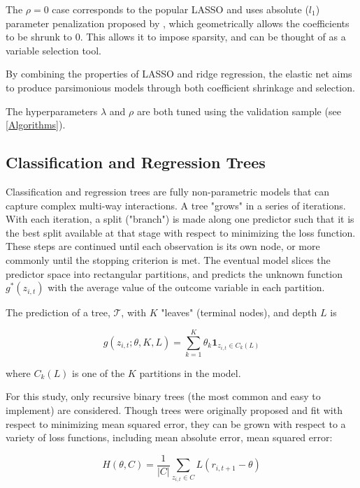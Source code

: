 \documentclass[a4paper, table]{article}
\begin{document}
The $\rho = 0$ case corresponds to the popular LASSO and uses absolute ($l_1$) parameter penalization proposed by \cite{tibshirani_regression_1996}, which geometrically allows the coefficients to be shrunk to 0. This allows it to impose sparsity, and can be thought of as a variable selection tool.

By combining the properties of LASSO and ridge regression, the elastic net aims to produce parsimonious models through both coefficient shrinkage and selection.

The hyperparameters $\lambda$ and $\rho$ are both tuned using the validation sample (see \ref{Algorithms}). 

\pagebreak

\subsection{Classification and Regression Trees}

Classification and regression trees are fully non-parametric models that can capture complex multi-way interactions. A tree "grows" in a series of iterations. With each iteration, a split ("branch") is made along one predictor such that it is the best split available at that stage with respect to minimizing the loss function. These steps are continued until each observation is its own node, or more commonly until the stopping criterion is met. The eventual model slices the predictor space into rectangular partitions, and predicts the unknown function $g^*(z_{i,t})$ with the average value of the outcome variable in each partition.

The prediction of a tree, $\mathcal{T}$, with \(K\) "leaves" (terminal nodes), and depth $L$ is

\begin{equation}
	g(z_{i,t};\theta,K,L) = \sum_{k=1}^{K}\theta_k\textbf{1}_{z_{i,t}\in C_k(L)}
\end{equation}

where $C_k(L)$ is one of the $K$ partitions in the model.

For this study, only recursive binary trees (the most common and easy to implement) are considered. Though trees were originally proposed and fit with respect to minimizing mean squared error, they can be grown with respect to a variety of loss functions, including mean absolute error, mean squared error:

\begin{equation}
	H(\theta, C) = \frac{1}{|C|} \sum_{z_{i,t} \in C} L(r_{i,t+1} - \theta)
\end{equation}
\end{document}
